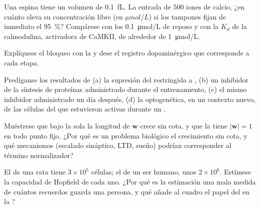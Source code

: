 \begin{exercise}[$\star\star$]\label{exo:b3:learning-memory:7}
Una espina tiene un volumen de \qty{0.1}{fL}. La entrada de $500$ iones
de calcio, ¿en cuánto eleva su concentración libre (en
$\unit{\micro mol/L}$) si los tampones fijan de inmediato el
\qty{95}{\%}? Compárese con los \qty{0.1}{\micro mol/L} de reposo y con
la $K_{d}$ de la calmodulina, activadora de CaMKII, de alrededor de
\qty{1}{\micro mol/L}.
\end{exercise}

\begin{exercise}[$\star\star$]\label{exo:b3:learning-memory:8}
Explíquese el bloqueo con la  y dese el
registro dopaminérgico que corresponde a cada etapa.
\end{exercise}

\begin{exercise}[$\star\star$]\label{exo:b3:learning-memory:9}
Predíganse los resultados de (a) la supresión del 
restringida a , (b) un inhibidor de la síntesis de proteínas
administrado durante el entrenamiento, (c) el mismo inhibidor
administrado un día después, (d) la  optogenética, en un
contexto nuevo, de las células del  que estuvieron activas
durante un .
\end{exercise}

\begin{exercise}[$\star\star\star$]\label{exo:b3:learning-memory:10}
Muéstrese que bajo la sola  la longitud de $\mathbf{w}$
crece sin cota, y que la  tiene $|\mathbf{w}| = 1$ en todo
punto fijo. ¿Por qué es un problema biológico el crecimiento sin cota,
y qué mecanismos (escalado sináptico, LTD, sueño) podrían corresponder
al término normalizador?
\end{exercise}

\begin{exercise}[$\star\star\star$]\label{exo:b3:learning-memory:11}
El  de una rata tiene $3\times 10^{5}$ células; el de un ser humano,
unos $2\times 10^{6}$. Estímese la capacidad de Hopfield de cada uno.
¿Por qué es la estimación una mala medida de cuántos recuerdos guarda
una persona, y qué añade al cuadro el papel del  en la
?
\end{exercise}


